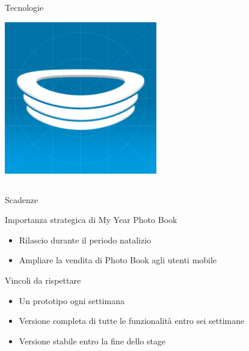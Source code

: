 \begin{frame}{Tecnologie}
\begin{minipage}{\textwidth}
\begin{minipage}{0.49\textwidth}
\begin{minipage}{0.48\textwidth}
\begin{flushright}
						\end{flushright}
					\end{minipage}
					\begin{minipage}{0.48\textwidth}
						\includegraphics[width=0.5\textwidth]{capitolo_2/immagini/hockeyapp.png}
					\end{minipage}
				\end{minipage}
			\end{minipage}
		\end{frame}
	\subsection{}
		\begin{frame}{Scadenze}
			\begin{block}{Importanza strategica di My Year Photo Book}
				\begin{itemize}
					\item Rilascio durante il periodo natalizio
					\item Ampliare la vendita di Photo Book agli utenti mobile
				\end{itemize}
			\end{block}
			\begin{block}{Vincoli da rispettare}
				\begin{itemize}
					\item Un prototipo ogni settimana
					\item Versione completa di tutte le funzionalità entro sei settimane
					\item Versione stabile entro la fine dello stage
				\end{itemize}
			\end{block}
		\end{frame}
